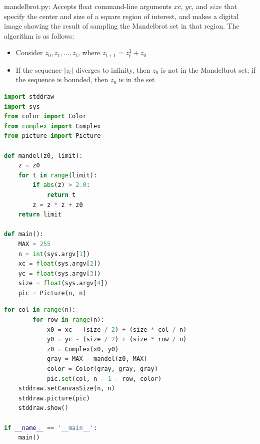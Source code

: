 \documentclass[8pt,a4paper,compress,handout]{beamer}
\begin{document}
\begin{frame}[fragile]
\begin{framed}
\tiny mandelbrot.py: Accepts float command-line arguments $xc$, $yc$, and $size$ that specify the center and size of a square region of interest, and makes a digital image showing the result of sampling the Mandelbrot set in that region. The algorithm is as follows:
\begin{itemize}
\item Consider $z_0, z_1, \dots, z_t$, where $z_{t+1}=z_t^2+z_0$
\item If the sequence $|z_t|$ diverges to infinity, then $z_0$ is not in the Mandelbrot set; if the sequence is bounded, then $z_0$ is in the set
\end{itemize}
\end{framed}

\begin{lstlisting}[language=Python]
import stddraw
import sys
from color import Color
from complex import Complex
from picture import Picture

def mandel(z0, limit):
    z = z0
    for t in range(limit):
        if abs(z) > 2.0:
            return t
        z = z * z + z0
    return limit

def main():
    MAX = 255
    n = int(sys.argv[1])
    xc = float(sys.argv[2])
    yc = float(sys.argv[3])
    size = float(sys.argv[4])
    pic = Picture(n, n)
\end{lstlisting}
\end{frame}

\begin{frame}[fragile]
\begin{lstlisting}[language=Python]
    for col in range(n):
        for row in range(n):
            x0 = xc - (size / 2) + (size * col / n)
            y0 = yc - (size / 2) + (size * row / n)
            z0 = Complex(x0, y0)
            gray = MAX - mandel(z0, MAX)
            color = Color(gray, gray, gray)
            pic.set(col, n - 1 - row, color)
    stddraw.setCanvasSize(n, n)
    stddraw.picture(pic)
    stddraw.show()

if __name__ == '__main__':
    main()
\end{lstlisting}
\end{frame}
\end{document}
